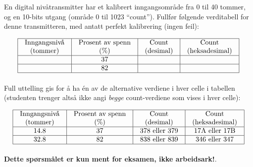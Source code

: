 
En digital nivåtransmitter har et kalibrert inngangsområde fra 0 til 40 tommer, og en 10-bits utgang (område 0 til 1023 ``count''). Fullfør følgende verditabell for denne transmitteren, med antatt perfekt kalibrering (ingen feil):


$$\vbox{\offinterlineskip
\halign{\strut
\vrule \quad\hfil # \ \hfil & 
\vrule \quad\hfil # \ \hfil & 
\vrule \quad\hfil # \ \hfil & 
\vrule \quad\hfil # \ \hfil \vrule \cr
\noalign{\hrule}
%
Inngangsnivå & Prosent av spenn & Count & Count \cr
%
(tommer) & (\%) & (desimal) & (heksadesimal) \cr
%
\noalign{\hrule}
%
 & 37 &  &  \cr
%
\noalign{\hrule}
%
 & 82 &  &  \cr
%
\noalign{\hrule}
} %
}$$ %







Full uttelling gis for å ha én av de alternative verdiene i hver celle i tabellen (studenten trenger altså ikke angi {\it begge} count-verdiene som vises i hver celle):


$$\vbox{\offinterlineskip
\halign{\strut
\vrule \quad\hfil # \ \hfil & 
\vrule \quad\hfil # \ \hfil & 
\vrule \quad\hfil # \ \hfil & 
\vrule \quad\hfil # \ \hfil \vrule \cr
\noalign{\hrule}
%
Inngangsnivå & Prosent av spenn & Count & Count \cr
%
(tommer) & (\%) & (desimal) & (heksadesimal) \cr
%
\noalign{\hrule}
%
14.8 & 37 & 378 eller 379 & 17A eller 17B \cr
%
\noalign{\hrule}
%
32.8 & 82 & 838 eller 839 & 346 eller 347 \cr
%
\noalign{\hrule}
} %
}$$ %







{\bf Dette spørsmålet er kun ment for eksamen, ikke arbeidsark!}.

